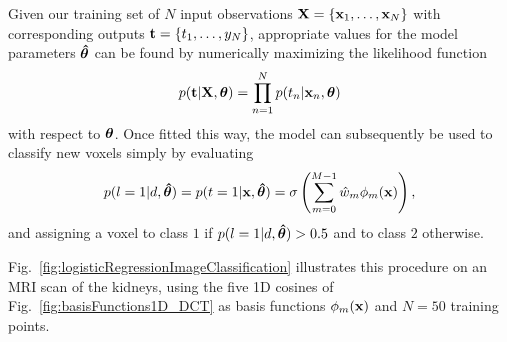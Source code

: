\documentclass[10pt,twoside]{book}
\begin{document}
Given our training set 
of $N$ 
input observations $\mathbf{X} = \{\mathbf{x}_1, \ldots, \mathbf{x}_N \}$
with corresponding outputs  $\mathbf{t} = \{ t_1, \ldots, y_N \}$,
appropriate values for the model parameters ${\mbox{\boldmath {${\hat{\theta}}$}}}$ can be found by numerically
maximizing the likelihood function
\begin{equation}
  p( \mathbf{t} | \mathbf{X}, {\mbox{\boldmath {${\theta}$}}} ) = \prod_{n=1}^N p( t_n | \mathbf{x}_n, {\mbox{\boldmath {${\theta}$}}} )
  \label{eq:NNLikelihood}
\end{equation}
with respect to ${\mbox{\boldmath {${\theta}$}}}$.
Once fitted this way,
the
model can subsequently be used to classify new voxels simply by evaluating  
$$
  p( l=1 | d, {\mbox{\boldmath {${\hat{\theta}}$}}} ) = 
  p( t=1 | \mathbf{x}, {\mbox{\boldmath {${\hat{\theta}}$}}} )
  = \sigma\left( \sum_{m=0}^{M-1} \hat{w}_m \phi_m( \mathbf{x} ) \right)
  ,
$$
and assigning a voxel to class $1$ if $p( l=1 | d, {\mbox{\boldmath {${\hat{\theta}}$}}} ) > 0.5$
and to class $2$ otherwise.

%
Fig.~\ref{fig:logisticRegressionImageClassification} illustrates this procedure on an MRI scan of the kidneys,
using the five 1D cosines of Fig.~\ref{fig:basisFunctions1D_DCT} as basis functions $\phi_m( \mathbf{x} )$ and $N=50$ training points.
\end{document}
